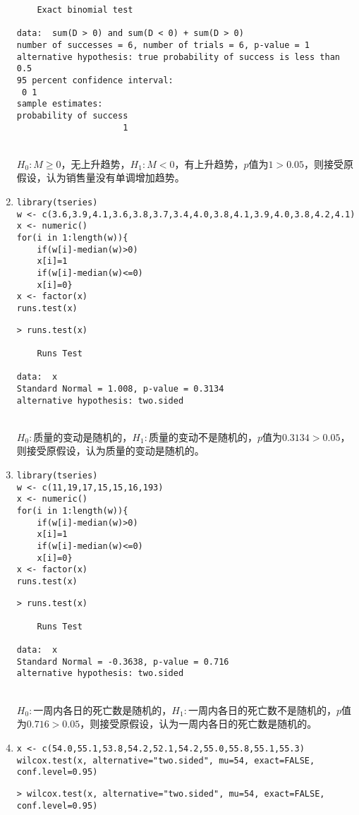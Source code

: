 \begin{enumerate}
\begin{lstlisting}
	Exact binomial test

data:  sum(D > 0) and sum(D < 0) + sum(D > 0)
number of successes = 6, number of trials = 6, p-value = 1
alternative hypothesis: true probability of success is less than 0.5
95 percent confidence interval:
 0 1
sample estimates:
probability of success 
                     1 
\end{lstlisting}
        \summary\\
        $H_0:M \geq 0$，无上升趋势，$H_1:M < 0$，有上升趋势，$p$值为$1>0.05$，则接受原假设，认为销售量没有单调增加趋势。
        \item
        \code
\begin{lstlisting}
library(tseries)
w <- c(3.6,3.9,4.1,3.6,3.8,3.7,3.4,4.0,3.8,4.1,3.9,4.0,3.8,4.2,4.1)
x <- numeric()
for(i in 1:length(w)){
    if(w[i]-median(w)>0)
	x[i]=1
	if(w[i]-median(w)<=0)
	x[i]=0}
x <- factor(x)
runs.test(x)
\end{lstlisting}
        \out
\begin{lstlisting}
> runs.test(x)

	Runs Test

data:  x
Standard Normal = 1.008, p-value = 0.3134
alternative hypothesis: two.sided
\end{lstlisting}
        \summary\\
        $H_0:$质量的变动是随机的，$H_1:$质量的变动不是随机的，$p$值为$0.3134>0.05$，则接受原假设，认为质量的变动是随机的。
        \item
        \code
\begin{lstlisting}
library(tseries)
w <- c(11,19,17,15,15,16,193)
x <- numeric()
for(i in 1:length(w)){
    if(w[i]-median(w)>0)
	x[i]=1
	if(w[i]-median(w)<=0)
	x[i]=0}
x <- factor(x)
runs.test(x)
\end{lstlisting}
        \out
\begin{lstlisting}
> runs.test(x)

	Runs Test

data:  x
Standard Normal = -0.3638, p-value = 0.716
alternative hypothesis: two.sided
\end{lstlisting}
        \summary\\
        $H_0:$一周内各日的死亡数是随机的，$H_1:$一周内各日的死亡数不是随机的，$p$值为$0.716>0.05$，则接受原假设，认为一周内各日的死亡数是随机的。
        \item
        \code
\begin{lstlisting}
x <- c(54.0,55.1,53.8,54.2,52.1,54.2,55.0,55.8,55.1,55.3)
wilcox.test(x, alternative="two.sided", mu=54, exact=FALSE, conf.level=0.95)
\end{lstlisting}
        \out
\begin{lstlisting}
> wilcox.test(x, alternative="two.sided", mu=54, exact=FALSE, conf.level=0.95)


\end{lstlisting}
\end{enumerate}
